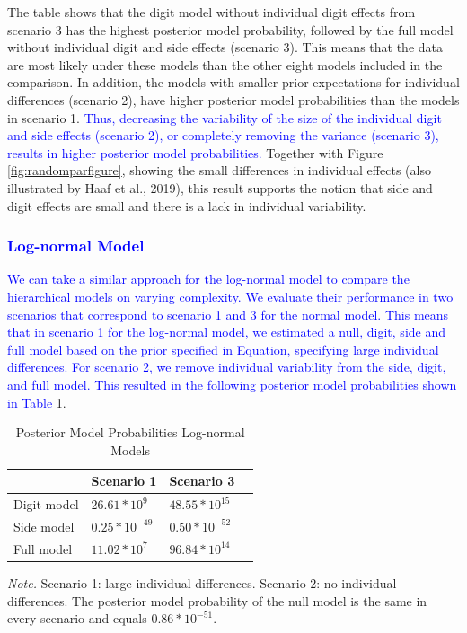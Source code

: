 \documentclass[
  english,
  doc,floatsintext]{apa6}
\begin{document}
The table shows that the digit model without individual digit effects from scenario 3 has the highest posterior model probability, followed by the full model without individual digit and side effects (scenario 3). This means that the data are most likely under these models than the other eight models included in the comparison. In addition, the models with smaller prior expectations for individual differences (scenario 2), have higher posterior model probabilities than the models in scenario 1. \textcolor{blue}{Thus, decreasing the variability of the size of the individual digit and side effects (scenario 2), or completely removing the variance (scenario 3), results in higher posterior model probabilities.} Together with Figure \ref{fig:randomparfigure}, showing the small differences in individual effects (also illustrated by Haaf et al., 2019), this result supports the notion that side and digit effects are small and there is a lack in individual variability.

\hypertarget{section}{%
\subsubsection{\texorpdfstring{\textcolor{blue}{Log-normal Model}}{}}\label{section}}

\textcolor{blue}{We can take a similar approach for the log-normal model to compare the hierarchical models on varying complexity. We evaluate their performance in two scenarios that correspond to scenario 1 and 3 for the normal model. This means that in scenario 1 for the log-normal model, we estimated a null, digit, side and full model based on the prior specified in Equation, specifying large individual differences. For scenario 2, we remove individual variability from the side, digit, and full model. This resulted in the following posterior model probabilities shown in Table} \ref{tab:postmodproblog}.

\begin{table}[H]
\caption{Posterior Model Probabilities Log-normal Models}
\label{tab:postmodproblog}
\begin{tabularx}{\textwidth}{XXXX}
\toprule
 & \multicolumn{1}{l}{Scenario 1} & \multicolumn{1}{l}{Scenario 3}\\
\midrule
Digit model & $26.61 * 10^9$ & $48.55 * 10^{15}$\\
Side model & $0.25 * 10^{-49}$  & $0.50 * 10^{-52}$ \\
Full model & $11.02 * 10^7$ &  $96.84 * 10^{14}$\\
\bottomrule
\end{tabularx}
\begin{tablenotes}[para]
\textit{Note.} Scenario 1: large individual differences. Scenario 2: no individual differences. The posterior model probability of the null model is the same in every scenario and equals $0.86*10^{-51}$. 
\end{tablenotes}
\end{table}
\end{document}
